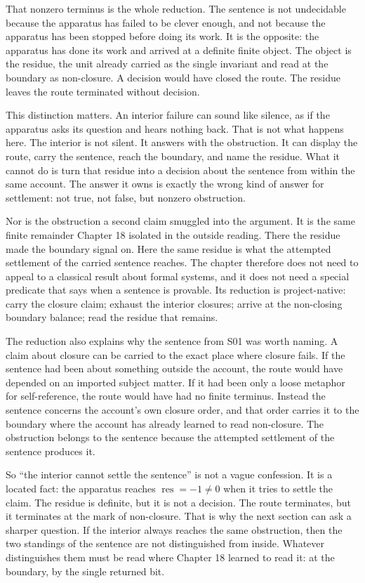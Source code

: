 That nonzero terminus is the whole reduction. The sentence is not undecidable because the
apparatus has failed to be clever enough, and not because the apparatus has been stopped before
doing its work. It is the opposite: the apparatus has done its work and arrived at a definite
finite object. The object is the residue, the unit already carried as the single invariant and
read at the boundary as non-closure. A decision would have closed the route. The residue leaves
the route terminated without decision.

This distinction matters. An interior failure can sound like silence, as if the apparatus asks
its question and hears nothing back. That is not what happens here. The interior is not silent.
It answers with the obstruction. It can display the route, carry the sentence, reach the
boundary, and name the residue. What it cannot do is turn that residue into a decision about the
sentence from within the same account. The answer it owns is exactly the wrong kind of answer
for settlement: not true, not false, but nonzero obstruction.

Nor is the obstruction a second claim smuggled into the argument. It is the same finite remainder
Chapter 18 isolated in the outside reading. There the residue made the boundary signal on. Here
the same residue is what the attempted settlement of the carried sentence reaches. The chapter
therefore does not need to appeal to a classical result about formal systems, and it does not
need a special predicate that says when a sentence is provable. Its reduction is project-native:
carry the closure claim; exhaust the interior closures; arrive at the non-closing boundary
balance; read the residue that remains.

The reduction also explains why the sentence from S01 was worth naming. A claim about closure
can be carried to the exact place where closure fails. If the sentence had been about something
outside the account, the route would have depended on an imported subject matter. If it had been
only a loose metaphor for self-reference, the route would have had no finite terminus. Instead
the sentence concerns the account's own closure order, and that order carries it to the boundary
where the account has already learned to read non-closure. The obstruction belongs to the
sentence because the attempted settlement of the sentence produces it.

So ``the interior cannot settle the sentence'' is not a vague confession. It is a located fact:
the apparatus reaches \(\operatorname{res}=-1\neq0\) when it tries to settle the claim. The
residue is definite, but it is not a decision. The route terminates, but it terminates at the
mark of non-closure. That is why the next section can ask a sharper question. If the interior
always reaches the same obstruction, then the two standings of the sentence are not
distinguished from inside. Whatever distinguishes them must be read where Chapter 18 learned to
read it: at the boundary, by the single returned bit.

